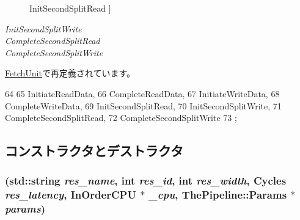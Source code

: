 \begin{Desc}
\begin{description}
{\hypertarget{classCacheUnit_a2afce0a47a93eee73a314d53e4890153aaf47086f5466118f146d338e86976a99}{
InitSecondSplitRead}
\label{classCacheUnit_a2afce0a47a93eee73a314d53e4890153aaf47086f5466118f146d338e86976a99}
}]\item[{\em 
\hypertarget{classCacheUnit_a2afce0a47a93eee73a314d53e4890153a5a47a9fa564ced7a71887316685bc335}{
InitSecondSplitWrite}
\label{classCacheUnit_a2afce0a47a93eee73a314d53e4890153a5a47a9fa564ced7a71887316685bc335}
}]\item[{\em 
\hypertarget{classCacheUnit_a2afce0a47a93eee73a314d53e4890153ac69978bc7a301e20e323e43b35b3e9f1}{
CompleteSecondSplitRead}
\label{classCacheUnit_a2afce0a47a93eee73a314d53e4890153ac69978bc7a301e20e323e43b35b3e9f1}
}]\item[{\em 
\hypertarget{classCacheUnit_a2afce0a47a93eee73a314d53e4890153a67738c183f321a947b53768e01b87a2c}{
CompleteSecondSplitWrite}
\label{classCacheUnit_a2afce0a47a93eee73a314d53e4890153a67738c183f321a947b53768e01b87a2c}
}]\end{description}
\end{Desc}



\hyperlink{classFetchUnit_a2afce0a47a93eee73a314d53e4890153}{FetchUnit}で再定義されています。


\begin{DoxyCode}
64                  {
65         InitiateReadData,
66         CompleteReadData,
67         InitiateWriteData,
68         CompleteWriteData,
69         InitSecondSplitRead,
70         InitSecondSplitWrite,
71         CompleteSecondSplitRead,
72         CompleteSecondSplitWrite
73     };
\end{DoxyCode}


\subsection{コンストラクタとデストラクタ}
\hypertarget{classCacheUnit_a24b18d6f820e0babe90abbfc838fc61c}{
\subsubsection[{CacheUnit}]{ (std::string {\em res\_\-name}, \/  int {\em res\_\-id}, \/  int {\em res\_\-width}, \/  {\bf Cycles} {\em res\_\-latency}, \/  {\bf InOrderCPU} $\ast$ {\em \_\-cpu}, \/  {\bf ThePipeline::Params} $\ast$ {\em params})}}
\label{classCacheUnit_a24b18d6f820e0babe90abbfc838fc61c}


